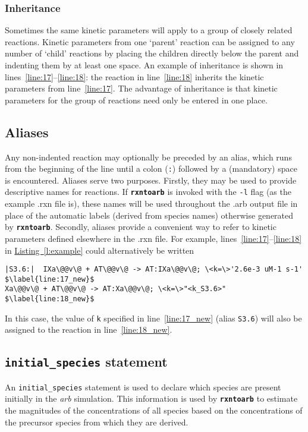 \documentclass[fontsize=12pt,
               captions=abovetable,
               numbers=noenddot,
              ]{scrartcl}
\newcommand{\listing}[1]{\hyperref[l:#1]{Listing~\ref{l:#1}}}
\newcommand{\rxntoarb}{\texttt{\textbf{rxntoarb}}}
\newcommand{\syntax}[2]{\textcolor{#1}{\texttt{#2}}}
\newcommand{\lnum}[1]{line~\ref{line:#1}}
\newcommand{\lnums}[2]{lines~\ref{line:#1}--\ref{line:#2}}
\begin{document}
\subsubsection{Inheritance}

Sometimes the same kinetic parameters will apply to a group of closely related reactions. Kinetic parameters from one `parent' reaction can be assigned to any number of `child' reactions by placing the children directly below the parent and indenting them by at least one space. An example of inheritance is shown in \lnums{17}{18}: the reaction in \lnum{18} inherits the kinetic parameters from \lnum{17}. The advantage of inheritance is that kinetic parameters for the group of reactions need only be entered in one place.

\subsection{Aliases \label{s:aliases}}
Any non-indented reaction may optionally be preceded by an alias, which runs from the beginning of the line until a colon (\syntax{type}{:}) followed by a (mandatory) space is encountered. Aliases serve two purposes. Firstly, they may be used to provide descriptive names for reactions. If \rxntoarb{} is invoked with the \texttt{-l} flag (as the example .rxn file is), these names will be used throughout the .arb output file in place of the automatic labels (derived from species names) otherwise generated by \rxntoarb. Secondly, aliases provide a convenient way to refer to kinetic parameters defined elsewhere in the .rxn file. For example, \lnums{17}{18} in \listing{example} could alternatively be written
%
\begin{lstlisting}[firstnumber=17]
|S3.6:|  IXa\@@v\@ + AT\@@v\@ -> AT:IXa\@@v\@; \<k=\>'2.6e-3 uM-1 s-1' $\label{line:17_new}$
Xa\@@v\@ + AT\@@v\@ -> AT:Xa\@@v\@; \<k=\>"<k_S3.6>" $\label{line:18_new}$
\end{lstlisting}
%
\noindent{}In this case, the value of \syntax{function}{k} specified in \lnum{17_new} (alias \syntax{type}{S3.6}) will also be assigned to the reaction in \lnum{18_new}.

\subsection{\syntax{statement}{initial\_species} statement}

An \syntax{statement}{initial\_species} statement is used to declare which species are present initially in the \emph{arb} simulation. This information is used by \rxntoarb{} to estimate the magnitudes of the concentrations of all species based on the concentrations of the precursor species from which they are derived. 
\end{document}
